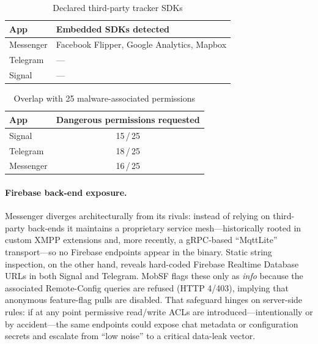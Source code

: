 \documentclass[a4paper,12pt]{report}
\begin{document}
\begin{table}[htbp]
  \centering
  \caption{Declared third-party tracker SDKs}
  \label{tab:trackers}
  \begin{tabular}{|l|p{7cm}|}
    \hline
    \textbf{App} & \textbf{Embedded SDKs detected} \\ \hline
    Messenger & Facebook Flipper, Google Analytics, Mapbox \\ \hline
    Telegram  & — \\ \hline
    Signal    & — \\ \hline
  \end{tabular}
\end{table}

\begin{table}[htbp]
  \centering
  \caption{Overlap with 25 malware-associated permissions}
  \label{tab:perm-malware}
  \begin{tabular}{|l|c|}
    \hline
    \textbf{App} & \textbf{Dangerous permissions requested} \\ \hline
    Signal    & 15\,/\,25 \\ \hline
    Telegram  & 18\,/\,25 \\ \hline
    Messenger & 16\,/\,25 \\ \hline
  \end{tabular}
\end{table}

\paragraph{Firebase back-end exposure.}

Messenger diverges architecturally from its rivals: instead of relying on third-party back-ends it maintains a proprietary service mesh—historically rooted in custom XMPP extensions and, more recently, a gRPC-based “MqttLite” transport—so no Firebase endpoints appear in the binary.
Static string inspection, on the other hand, reveals hard-coded Firebase Realtime Database URLs in both Signal and Telegram. MobSF flags these only as \textit{info} because the associated Remote-Config queries are refused (HTTP 4/403), implying that anonymous feature-flag pulls are disabled. That safeguard hinges on server-side rules: if at any point permissive read/write ACLs are introduced—intentionally or by accident—the same endpoints could expose chat metadata or configuration secrets and escalate from “low noise” to a critical data-leak vector.
\end{document}
